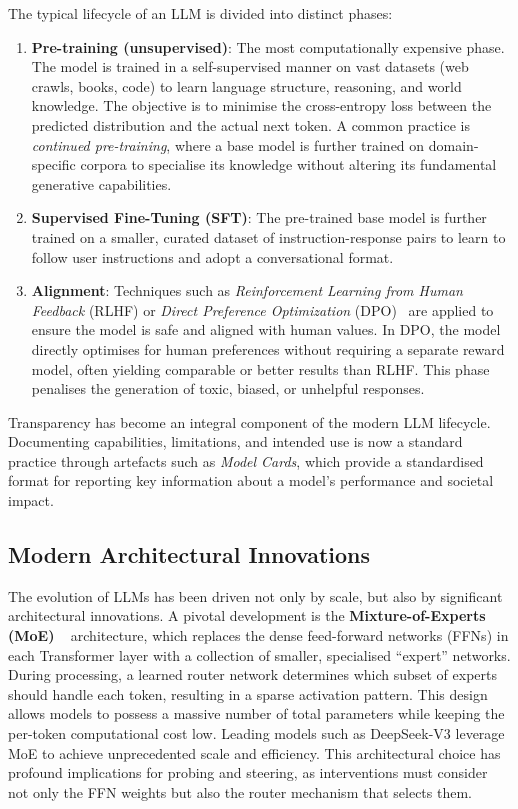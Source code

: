 The typical lifecycle of an LLM is divided into distinct phases:

\begin{enumerate}
    \item \textbf{Pre-training (unsupervised)}: The most computationally expensive phase. The
          model is trained in a self-supervised manner on vast datasets (web crawls, books, code)
          to learn language structure, reasoning, and world knowledge. The objective is to
          minimise the cross-entropy loss between the predicted distribution and the actual next
          token. A common practice is \textit{continued pre-training}, where a base model is
          further trained on domain-specific corpora to specialise its knowledge without altering
          its fundamental generative capabilities.

    \item \textbf{Supervised Fine-Tuning (SFT)}: The pre-trained base model is further trained on
          a smaller, curated dataset of instruction-response pairs to learn to follow user
          instructions and adopt a conversational format.

    \item \textbf{Alignment}: Techniques such as \textit{Reinforcement Learning from Human
          Feedback} (RLHF) or \textit{Direct Preference Optimization}
          (DPO)~\cite{DPO} are applied to ensure the model is safe and aligned with human
          values. In DPO, the model directly optimises for human preferences without requiring
          a separate reward model, often yielding comparable or better results than RLHF.
          This phase penalises the generation of toxic, biased, or unhelpful responses.
\end{enumerate}

Transparency has become an integral component of the modern LLM lifecycle. Documenting
capabilities, limitations, and intended use is now a standard practice through artefacts such as
\textit{Model Cards}, which provide a standardised format for reporting key information about a
model's performance and societal impact.


\subsection{Modern Architectural Innovations}

The evolution of LLMs has been driven not only by scale, but also by significant architectural
innovations. A pivotal development is the \textbf{Mixture-of-Experts (MoE)} ~\cite{MoE} architecture, which
replaces the dense feed-forward networks (FFNs) in each Transformer layer with a collection of
smaller, specialised ``expert'' networks. During processing, a learned router
network determines which subset of experts should handle each token, resulting in a sparse
activation pattern. This design allows models to possess a massive number of total parameters
while keeping the per-token computational cost low. Leading models such as
DeepSeek-V3 leverage MoE to achieve unprecedented scale and efficiency. This
architectural choice has profound implications for probing and steering, as interventions must
consider not only the FFN weights but also the router mechanism that selects them.

